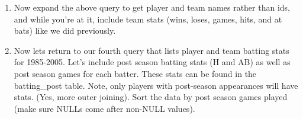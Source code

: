 \documentclass[nobib]{tufte-handout}
\begin{document}
\begin{enumerate}
    \item Now expand the above query to get player and team names rather than ids, and while you're at it, include team stats (wins, loses, games, hits, and at bats) like we did previously. 
    \item Now lets return to our fourth query that lists player and team batting stats for 1985-2005.  Let's include post season batting stats (H and AB) as well as post season games for each batter. These stats can be found in the batting\_{}post table. Note, only players with post-season appearances will have stats. (Yes, more outer joining). Sort the data by post season games played (make sure NULLs come after non-NULL values).
\end{enumerate}
\end{document}
